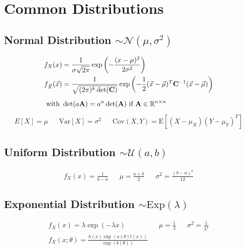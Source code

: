 \section{Common Distributions}
\begin{mdframed}[style=eqbox]
  \subsection{Normal Distribution $\sim \mathcal{N}(\mu, \sigma^2)$}
  \begin{align*}
    f_X(x) &= \frac{1}{\sigma \sqrt{2 \pi}} \exp\left(-\frac{(x-\mu)^2}{2 \sigma^2}\right)\\
    f_{\vec{X}}(\vec{x}) &= \frac{1}{\sqrt{(2 \pi)^k \det(\mathbf{C})}} \exp\left(-\frac{1}{2} (\vec{x}-\vec{\mu})^T \mathbf{C}^{-1} (\vec{x}-\vec{\mu})\right)\\[0.5em]
    \text{with~} &\det(a \mathbf{A}) = a^n \det(\mathbf{A}) \text{~if~} \mathbf{A} \in \mathbb{R}^{n \times n}
  \end{align*}
  \begin{align*}
    E[X] = \mu && \text{Var}[X] = \sigma^2 && \text{Cov}(X,Y) = \text{E}[(X-\mu_X)(Y-\mu_Y)^T]
  \end{align*}
\end{mdframed}

\begin{mdframed}[style=eqbox]
  \subsection{Uniform Distribution $\sim \mathcal{U}(a,b)$}
  \begin{align*}
    f_X(x) = \frac{1}{b-a} && \mu = \frac{a+b}{2} && \sigma^2 = \frac{(b-a)^2}{12}
  \end{align*}
\end{mdframed}

\begin{mdframed}[style=eqbox]
  \subsection{Exponential Distribution $\sim \text{Exp}(\lambda)$}
  \begin{align*}
    f_X(x) = \lambda \exp(-\lambda x) && \mu = \frac{1}{\lambda} && \sigma^2 = \frac{1}{\lambda^2}\\
    f_X(x; \theta) = \frac{h(x)\exp(a(\theta)t(x))}{\exp(b(\theta))}
  \end{align*}
\end{mdframed}

